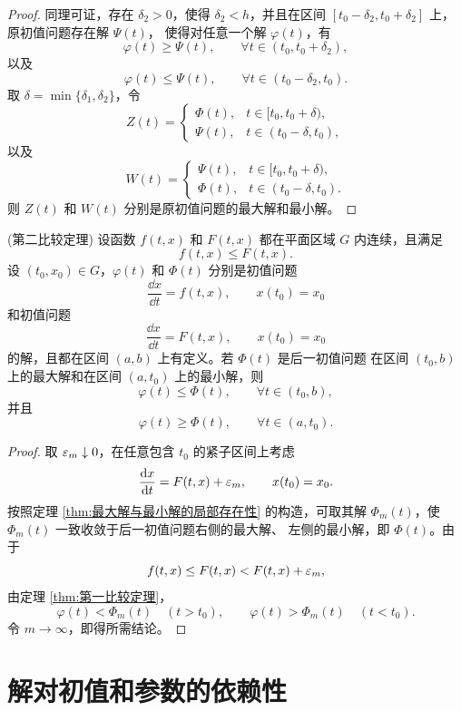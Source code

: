 \begin{proof}
	同理可证，存在 $\delta_2>0$，使得 $\delta_2<h$，并且在区间
	$[t_0-\delta_2,t_0+\delta_2]$ 上，原初值问题存在解 $\Psi(t)$，
	使得对任意一个解 $\varphi(t)$，有
	\[
		\varphi(t)\geq\Psi(t),
		\qquad \forall t\in(t_0,t_0+\delta_2),
	\]
	以及
	\[
		\varphi(t)\leq\Psi(t),
		\qquad \forall t\in(t_0-\delta_2,t_0).
	\]
	取 $\delta=\min\{\delta_1,\delta_2\}$，令
	\[
		Z(t)=
		\begin{cases}
			\Phi(t), & t\in[t_0,t_0+\delta),\\
			\Psi(t), & t\in(t_0-\delta,t_0),
		\end{cases}
	\]
	以及
	\[
		W(t)=
		\begin{cases}
			\Psi(t), & t\in[t_0,t_0+\delta),\\
			\Phi(t), & t\in(t_0-\delta,t_0).
		\end{cases}
	\]
	则 $Z(t)$ 和 $W(t)$ 分别是原初值问题的最大解和最小解。
\end{proof}

\begin{theorem}(第二比较定理)\label{thm:第二比较定理}
	设函数 $f(t,x)$ 和 $F(t,x)$ 都在平面区域 $G$ 内连续，且满足
	\[
		f(t,x)\leq F(t,x).
	\]
	设 $(t_0,x_0)\in G$，$\varphi(t)$ 和 $\Phi(t)$ 分别是初值问题
	\[
		\dfrac{\dd x}{\dd t}=f(t,x),
		\qquad x(t_0)=x_0
	\]
	和初值问题
	\[
		\dfrac{\dd x}{\dd t}=F(t,x),
		\qquad x(t_0)=x_0
	\]
	的解，且都在区间 $(a,b)$ 上有定义。若 $\Phi(t)$ 是后一初值问题
	在区间 $(t_0,b)$ 上的最大解和在区间 $(a,t_0)$ 上的最小解，则
	\[
		\varphi(t)\leq\Phi(t),
		\qquad \forall t\in(t_0,b),
	\]
	并且
	\[
		\varphi(t)\geq\Phi(t),
		\qquad \forall t\in(a,t_0).
	\]
\end{theorem}

\begin{proof}
	取 $\varepsilon_m\downarrow0$，在任意包含 $t_0$ 的紧子区间上考虑
	\[
		\dfrac{\mathrm{d} x}{\mathrm{d} t}=F(t,x)+\varepsilon_m,
		\qquad x(t_0)=x_0.
	\]
	按照定理 \ref{thm:最大解与最小解的局部存在性} 的构造，可取其解
	$\Phi_m(t)$，使 $\Phi_m(t)$ 一致收敛于后一初值问题右侧的最大解、
	左侧的最小解，即 $\Phi(t)$。由于
	\[
		f(t,x)\leq F(t,x)<F(t,x)+\varepsilon_m,
	\]
	由定理 \ref{thm:第一比较定理}，
	\[
		\varphi(t)<\Phi_m(t)\quad(t>t_0),
		\qquad
		\varphi(t)>\Phi_m(t)\quad(t<t_0).
	\]
	令 $m\to\infty$，即得所需结论。
\end{proof}
\section{解对初值和参数的依赖性}\label{sec:解对初值和参数的依赖性}

